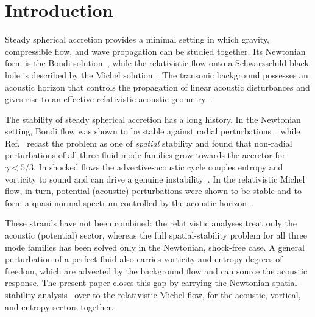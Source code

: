 \documentclass[12pt,a4paper,preprint,nopreprintline]{elsarticle}
\begin{document}
\section{Introduction}
\label{sec:introduction}

Steady spherical accretion provides a minimal setting in which gravity, compressible flow, and wave propagation can be studied together. Its Newtonian form is the Bondi solution~\cite{BondiH_OnSphericallySymmetricalAccretion_1953}, while the relativistic flow onto a Schwarzschild black hole is described by the Michel solution~\cite{MichelFC_AccretionOfMatterByCondensedObjects_1972}. The transonic background possesses an acoustic horizon that controls the propagation of linear acoustic disturbances and gives rise to an effective relativistic acoustic geometry~\cite{MoncriefV_StabilityOfStationarySphericalAccretionOntoASchwarzschildBlackHole_1980,BilicN_RelativisticAcousticGeometry_1999}.

The stability of steady spherical accretion has a long history. In the Newtonian setting, Bondi flow was shown to be stable against radial perturbations~\cite{GarlickAR_TheStabilityOfBondiAccretion_1979,PettersonJA_SilkJ_OstrikerJP_VariationsOnAShpericallySymmetricalAccretionFlow_1980}, while Ref.~\cite{KovalenkoIG_EreminMA_SpatialInstabilityOfSphericalAccretion_1998} recast the problem as one of \emph{spatial} stability and found that non-radial perturbations of all three fluid mode families grow towards the accretor for $\gamma<5/3$. In shocked flows the advective-acoustic cycle couples entropy and vorticity to sound and can drive a genuine instability~\cite{FoglizzoT_TaggerM_EntropicAcousticInstabilityInShockedAccretionFlows_2000,FoglizzoT_EntropicAcousticInstabilityOfShockedBondiAccretionIWhatDoesPerturbedBondiAccretionSoundLike_2000}. In the relativistic Michel flow, in turn, potential (acoustic) perturbations were shown to be stable and to form a quasi-normal spectrum controlled by the acoustic horizon~\cite{MoncriefV_StabilityOfStationarySphericalAccretionOntoASchwarzschildBlackHole_1980,ChaverraE_MoralesMD_SarbachO_QuasinormalAcousticOscillationsInTheMichelFlow_2015}.

These strands have not been combined: the relativistic analyses treat only the acoustic (potential) sector, whereas the full spatial-stability problem for all three mode families has been solved only in the Newtonian, shock-free case. A general perturbation of a perfect fluid also carries vorticity and entropy degrees of freedom, which are advected by the background flow and can source the acoustic response. The present paper closes this gap by carrying the Newtonian spatial-stability analysis~\cite{KovalenkoIG_EreminMA_SpatialInstabilityOfSphericalAccretion_1998} over to the relativistic Michel flow, for the acoustic, vortical, and entropy sectors together.
\end{document}
